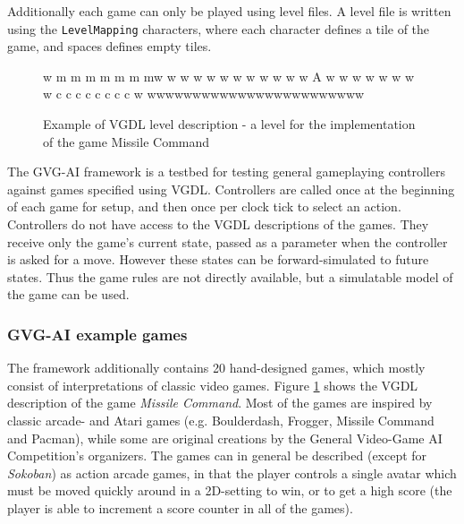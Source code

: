 \documentclass[a4paper,titlepage,final, twoside]{report}
\begin{document}
Additionally each game can only be played using level files. 
A level file is written using the \texttt{LevelMapping} characters, where each character defines a tile of the game, and spaces defines empty tiles.

\begin{figure}[!ht]
\centering
\begin{vgdldesc}[linewidth=14cm]
w    m  m   m  m  m m mw
w                      w
w                      w
w                      w
w                      w
w                      w
w           A          w
w                      w
w                      w
w                      w
w   c c c c c c c c    w
wwwwwwwwwwwwwwwwwwwwwwww
\end{vgdldesc}
\caption{Example of VGDL level description - a level for the implementation of the game Missile Command}
\label{fig:vgdl}
\end{figure}


The GVG-AI framework is a testbed for testing general gameplaying controllers against games specified using VGDL. Controllers are called once at the beginning of each game for setup, and then once per clock tick to select an action. Controllers do not have access to the VGDL descriptions of the games. They receive only the game's current state, passed as a parameter when the controller is asked for a move. However these states can be forward-simulated to future states. Thus the game rules are not directly available, but a simulatable model of the game can be used.

\subsubsection*{GVG-AI example games}
The framework additionally contains 20 hand-designed games, which mostly consist of interpretations of classic video games. Figure \ref{fig:vgdl} shows the VGDL description of the game \emph{Missile Command}.
Most of the games are inspired by classic arcade- and Atari games (e.g. Boulderdash, Frogger, Missile Command and Pacman), while some are original creations by the General Video-Game AI Competition's organizers. 
The games can in general be described (except for \emph{Sokoban}) as action arcade games, in that the player controls a single avatar which must be moved quickly around in a 2D-setting to win, or to get a high score (the player is able to increment a score  counter in all of the games).
\end{document}
